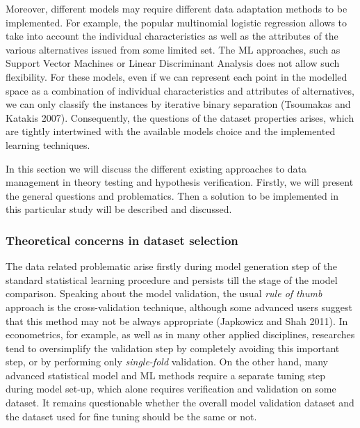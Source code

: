 \documentclass[11pt,]{article}
\begin{document}
Moreover, different models may require different data adaptation methods
to be implemented. For example, the popular multinomial logistic
regression allows to take into account the individual characteristics as
well as the attributes of the various alternatives issued from some
limited set. The ML approaches, such as Support Vector Machines or
Linear Discriminant Analysis does not allow such flexibility. For these
models, even if we can represent each point in the modelled space as a
combination of individual characteristics and attributes of
alternatives, we can only classify the instances by iterative binary
separation (Tsoumakas and Katakis 2007). Consequently, the questions of
the dataset properties arises, which are tightly intertwined with the
available models choice and the implemented learning techniques.

In this section we will discuss the different existing approaches to
data management in theory testing and hypothesis verification. Firstly,
we will present the general questions and problematics. Then a solution
to be implemented in this particular study will be described and
discussed.

\hypertarget{theoretical-concerns-in-dataset-selection}{%
\subsubsection{Theoretical concerns in dataset
selection}\label{theoretical-concerns-in-dataset-selection}}

The data related problematic arise firstly during model generation step
of the standard statistical learning procedure and persists till the
stage of the model comparison. Speaking about the model validation, the
usual \emph{rule of thumb} approach is the cross-validation technique,
although some advanced users suggest that this method may not be always
appropriate (Japkowicz and Shah 2011). In econometrics, for example, as
well as in many other applied disciplines, researches tend to
oversimplify the validation step by completely avoiding this important
step, or by performing only \emph{single-fold} validation. On the other
hand, many advanced statistical model and ML methods require a separate
tuning step during model set-up, which alone requires verification and
validation on some dataset. It remains questionable whether the overall
model validation dataset and the dataset used for fine tuning should be
the same or not.
\end{document}

